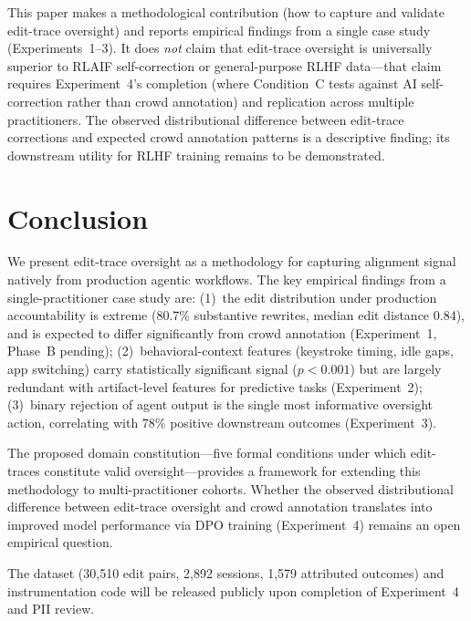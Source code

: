 \documentclass[11pt]{article}
\begin{document}
This paper makes a methodological contribution (how to capture and validate edit-trace oversight) and reports empirical findings from a single case study (Experiments~1--3).
It does \emph{not} claim that edit-trace oversight is universally superior to RLAIF self-correction or general-purpose RLHF data---that claim requires Experiment~4's completion (where Condition~C tests against AI self-correction rather than crowd annotation) and replication across multiple practitioners.
The observed distributional difference between edit-trace corrections and expected crowd annotation patterns is a descriptive finding; its downstream utility for RLHF training remains to be demonstrated.


\section{Conclusion}
\label{sec:conclusion}

We present edit-trace oversight as a methodology for capturing alignment signal natively from production agentic workflows.
The key empirical findings from a single-practitioner case study are:
(1)~the edit distribution under production accountability is extreme (80.7\% substantive rewrites, median edit distance 0.84), and is expected to differ significantly from crowd annotation (Experiment~1, Phase~B pending);
(2)~behavioral-context features (keystroke timing, idle gaps, app switching) carry statistically significant signal ($p < 0.001$) but are largely redundant with artifact-level features for predictive tasks (Experiment~2);
(3)~binary rejection of agent output is the single most informative oversight action, correlating with 78\% positive downstream outcomes (Experiment~3).

The proposed domain constitution---five formal conditions under which edit-traces constitute valid oversight---provides a framework for extending this methodology to multi-practitioner cohorts.
Whether the observed distributional difference between edit-trace oversight and crowd annotation translates into improved model performance via DPO training (Experiment~4) remains an open empirical question.

The dataset (30{,}510 edit pairs, 2{,}892 sessions, 1{,}579 attributed outcomes) and instrumentation code will be released publicly upon completion of Experiment~4 and PII review.

\appendix
\end{document}
